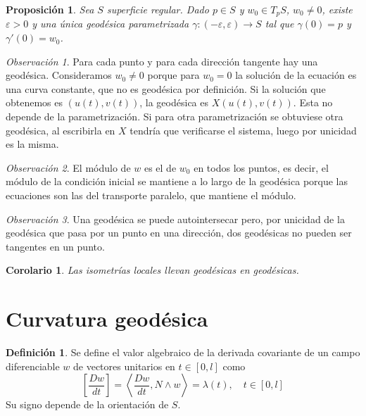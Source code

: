 \documentclass{report}
\newtheorem{corollary}[theorem]{Corolario}
\newtheorem{proposition}[theorem]{Proposición}
\theoremstyle{remark}
\newtheorem*{remark}{Observación}
\theoremstyle{remark}
\theoremstyle{definition}
\newtheorem{definition}{Definición}[chapter]
\theoremstyle{definition}
\theoremstyle{definition}
\begin{document}
\begin{proposition}
    Sea $S$ superficie regular.
    Dado $p \in S$ y $w_0 \in T_pS$, $w_0 \neq 0$, existe $\varepsilon > 0$ y una única geodésica parametrizada $\gamma : (-\varepsilon, \varepsilon) \to S$ tal que $\gamma(0) = p$ y $\gamma'(0) = w_0$.
\end{proposition}

\begin{remark}
    Para cada punto y para cada dirección tangente hay una geodésica.
    Consideramos $w_0 \neq 0$ porque para $w_0 = 0$ la solución de la ecuación es una curva constante, que no es geodésica por definición.
    Si la solución que obtenemos es $(u(t), v(t))$, la geodésica es $X(u(t), v(t))$.
    Esta no depende de la parametrización. Si para otra parametrización se obtuviese otra geodésica, al escribirla en $X$ tendría que verificarse el sistema, luego por unicidad es la misma.
\end{remark}

\begin{remark}
    El módulo de $w$ es el de $w_0$ en todos los puntos, es decir, el módulo de la condición inicial se mantiene a lo largo de la geodésica porque las ecuaciones son las del transporte paralelo, que mantiene el módulo.
\end{remark}

\begin{remark}
    Una geodésica se puede autointersecar pero, por unicidad de la geodésica que pasa por un punto en una dirección, dos geodésicas no pueden ser tangentes en un punto.
\end{remark}

\begin{corollary}
    Las isometrías locales llevan geodésicas en geodésicas.
\end{corollary}

\section{Curvatura geodésica}

\begin{definition}
    Se define el valor algebraico de la derivada covariante de un campo diferenciable $w$ de vectores unitarios en $t \in [0, l]$ como
    $$\left[ \frac{Dw}{dt} \right] = \left\langle \frac{Dw}{dt}, N \land w \right\rangle = \lambda(t), \quad t \in [0, l]$$
    Su signo depende de la orientación de $S$.
\end{definition}
\end{document}
